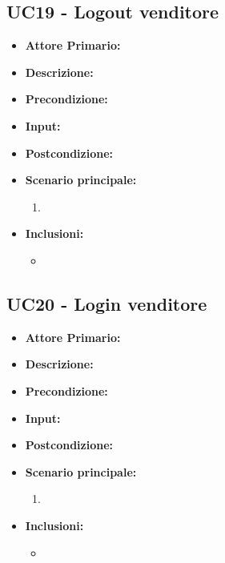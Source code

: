 \subsection{UC19 - Logout venditore}
\begin{itemize}
    \item \textbf{Attore Primario:} 
    \item \textbf{Descrizione:}
    \item \textbf{Precondizione:}
    \item \textbf{Input:}
    \item \textbf{Postcondizione:}
    \item \textbf{Scenario principale:}
    \begin{enumerate}
        \item 
    \end{enumerate}
    \item \textbf{Inclusioni:}
    \begin{itemize}
        \item
    \end{itemize}
\end{itemize}
\subsection{UC20 - Login venditore}
\begin{itemize}
    \item \textbf{Attore Primario:} 
    \item \textbf{Descrizione:}
    \item \textbf{Precondizione:}
    \item \textbf{Input:}
    \item \textbf{Postcondizione:}
    \item \textbf{Scenario principale:}
    \begin{enumerate}
        \item 
    \end{enumerate}
    \item \textbf{Inclusioni:}
    \begin{itemize}
        \item
    \end{itemize}
\end{itemize}